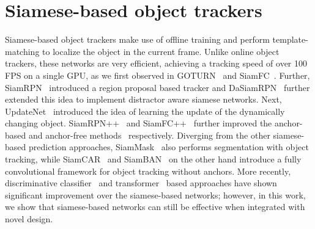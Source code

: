 \section{Siamese-based object trackers}
Siamese-based object trackers make use of offline training and perform template-matching to localize the object in the current frame. Unlike online object trackers, these networks are very efficient, achieving a tracking speed of over 100 FPS on a single GPU, as we first observed in GOTURN~\cite{held2016learning} and SiamFC~\cite{bertinetto2016fully}. Further, SiamRPN~\cite{li2018high} introduced a region proposal based tracker and DaSiamRPN~\cite{zhu2018distractor} further extended this idea to implement distractor aware siamese networks. Next, UpdateNet~\cite{zhang2019learning} introduced the idea of learning the update of the dynamically changing object. SiamRPN++~\cite{li2019siamrpn++} and SiamFC++~\cite{xu2020siamfc++} further improved the anchor-based and anchor-free methods~\cite{bertinetto2016fully} respectively. Diverging from the other siamese-based prediction approaches, SiamMask~\cite{wang2019fast} also performs segmentation with object tracking, while SiamCAR~\cite{guo2020siamcar} and SiamBAN~\cite{chen2020siamese} on the other hand introduce a fully convolutional framework for object tracking without anchors. More recently, discriminative classifier~\cite{mayer2021learning} and transformer~\cite{yan2021learning, cui2022mixformer} based approaches have shown significant improvement over the siamese-based networks; however, in this work, we show that siamese-based networks can still be effective when integrated with novel design. 


